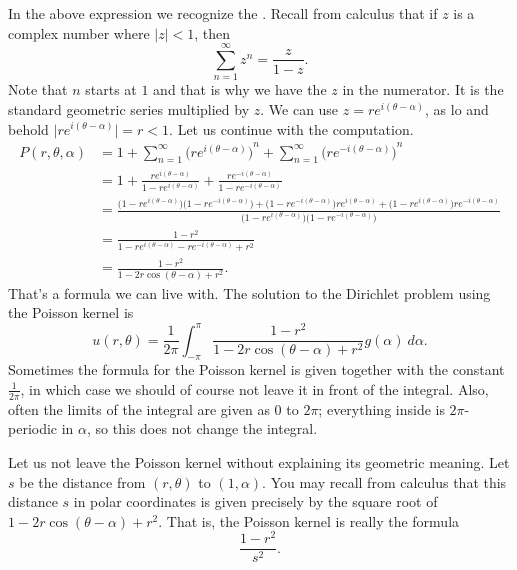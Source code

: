In the above expression we recognize the
\emph{}.
Recall from calculus that if $z$ is a complex number where $\lvert z \rvert < 1$, then
\begin{equation*}
\sum_{n=1}^\infty z^n = \frac{z}{1-z} .
\end{equation*}
Note that $n$ starts at $1$ and that is why we have the $z$ in the numerator.
It is the standard geometric series multiplied by $z$.
We can use $z = re^{i(\theta-\alpha)}$, as
lo and behold $\lvert re^{i(\theta-\alpha)} \rvert = r < 1$.
Let us
continue with the computation.
\begin{equation*}
\begin{split}
P(r,\theta,\alpha)
& =
1
+
\sum_{n=1}^\infty
{\bigl(
re^{i(\theta-\alpha)}\bigr)}^{n}
+
\sum_{n=1}^\infty
{\bigl(
re^{-i(\theta-\alpha)}\bigr)}^{n}
\\
& =
1
+
\frac{re^{i(\theta-\alpha)}}{1-re^{i(\theta-\alpha)}}
+
\frac{re^{-i(\theta-\alpha)}}{1-re^{-i(\theta-\alpha)}}
\\
& = 
\frac{
\bigl(1-re^{i(\theta-\alpha)}\bigr)\bigl(1-re^{-i(\theta-\alpha)}\bigr)
+
\bigl(1-re^{-i(\theta-\alpha)}\bigr)re^{i(\theta-\alpha)} +
\bigl(1-re^{i(\theta-\alpha)}\bigr)re^{-i(\theta-\alpha)}}
{\bigl(1-re^{i(\theta-\alpha)}\bigr)\bigl(1-re^{-i(\theta-\alpha)}\bigr)}
\\
& = 
\frac{1 -r^2}{1 - re^{i(\theta-\alpha)} - re^{-i(\theta-\alpha)} +r^2}
\\
& = 
\frac{1 -r^2}{1 - 2r\cos(\theta-\alpha) +r^2} .
\end{split}
\end{equation*}
That's a formula we can live with.  The
solution to the Dirichlet problem using the Poisson kernel is
\begin{equation*}
\boxed{~~
u(r,\theta) = 
\frac{1}{2\pi} \int_{-\pi}^{\pi}
\frac{1 -r^2}{1 - 2r\cos(\theta-\alpha) +r^2} g(\alpha) ~ d\alpha .
~~}
\end{equation*}
Sometimes the formula for the Poisson kernel is
given together with the constant $\frac{1}{2\pi}$, in which case we should
of course not leave it in front of the integral.
Also, often the limits
of the integral are given as 0 to $2\pi$; everything inside is
$2\pi$-periodic in $\alpha$, so this does not change the integral.

\begin{mywrapfigsimp}[12]{2.1in}{2.4in}
\vspace*{5pt}
\noindent
{}
\end{mywrapfigsimp}
Let us not leave the Poisson kernel without explaining its geometric
meaning.  Let $s$ be the distance from $(r,\theta)$ to
$(1,\alpha)$.
You may recall from calculus that
this distance $s$ in polar coordinates is given precisely by the square root
of $1 - 2r\cos(\theta-\alpha) +r^2$.  That is, the Poisson kernel is really
the formula
\begin{equation*}
\frac{1-r^2}{s^2} .
\end{equation*}

